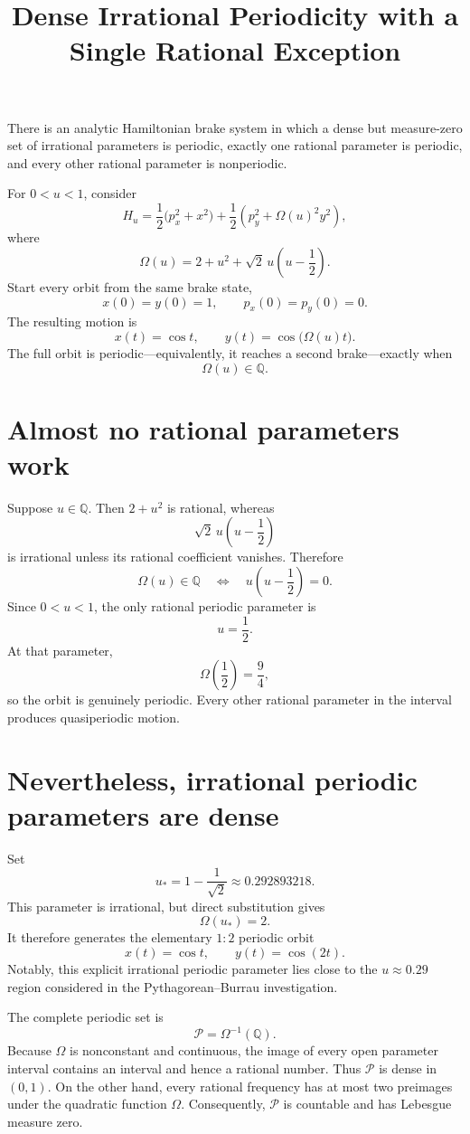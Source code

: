 \documentclass[11pt]{article}
\title{Dense Irrational Periodicity with a Single Rational Exception}
\author{}
\date{}
\begin{document}
\maketitle

There is an analytic Hamiltonian brake system in which a dense but
measure-zero set of irrational parameters is periodic, exactly one rational
parameter is periodic, and every other rational parameter is nonperiodic.

For \(0<u<1\), consider
\[
  H_u
  =\frac12\bigl(p_x^2+x^2\bigr)
   +\frac12\left(p_y^2+\Omega(u)^2y^2\right),
\]
where
\[
  \Omega(u)=2+u^2+\sqrt2\,u\left(u-\frac12\right).
\]
Start every orbit from the same brake state,
\[
  x(0)=y(0)=1,
  \qquad
  p_x(0)=p_y(0)=0.
\]
The resulting motion is
\[
  x(t)=\cos t,
  \qquad
  y(t)=\cos\!\bigl(\Omega(u)t\bigr).
\]
The full orbit is periodic---equivalently, it reaches a second brake---exactly
when
\[
  \Omega(u)\in\mathbb Q.
\]

\section*{Almost no rational parameters work}

Suppose \(u\in\mathbb Q\).  Then \(2+u^2\) is rational, whereas
\[
  \sqrt2\,u\left(u-\frac12\right)
\]
is irrational unless its rational coefficient vanishes.  Therefore
\[
  \Omega(u)\in\mathbb Q
  \quad\Longleftrightarrow\quad
  u\left(u-\frac12\right)=0.
\]
Since \(0<u<1\), the only rational periodic parameter is
\[
  \boxed{u=\frac12}.
\]
At that parameter,
\[
  \Omega\left(\frac12\right)=\frac94,
\]
so the orbit is genuinely periodic.  Every other rational parameter in the
interval produces quasiperiodic motion.

\section*{Nevertheless, irrational periodic parameters are dense}

Set
\[
  u_*=1-\frac1{\sqrt2}
      \approx0.292893218.
\]
This parameter is irrational, but direct substitution gives
\[
  \Omega(u_*)=2.
\]
It therefore generates the elementary \(1{:}2\) periodic orbit
\[
  x(t)=\cos t,
  \qquad
  y(t)=\cos(2t).
\]
Notably, this explicit irrational periodic parameter lies close to the
\(u\approx0.29\) region considered in the Pythagorean--Burrau investigation.

The complete periodic set is
\[
  \mathcal P=\Omega^{-1}(\mathbb Q).
\]
Because \(\Omega\) is nonconstant and continuous, the image of every open
parameter interval contains an interval and hence a rational number.  Thus
\(\mathcal P\) is dense in \((0,1)\).  On the other hand, every rational
frequency has at most two preimages under the quadratic function \(\Omega\).
Consequently, \(\mathcal P\) is countable and has Lebesgue measure zero.
\end{document}
